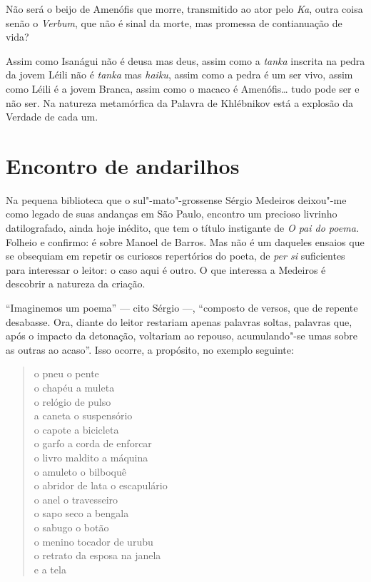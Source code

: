 {Não será o beijo de Amenófis que morre, transmitido ao ator pelo
\emph{Ka}, outra coisa senão o \emph{Verbum}, que não é sinal da morte,
mas promessa de contianuação de vida?

Assim como Isanágui não é deusa mas deus, assim como a \emph{tanka}
inscrita na pedra da jovem Léili não é \emph{tanka} mas \emph{haiku},
assim como a pedra é um ser vivo, assim como Léili é a jovem Branca,
assim como o macaco é Amenófis\ldots{} tudo pode ser e não ser. Na natureza
metamórfica da Palavra de Khlébnikov está a explosão da Verdade de cada
um.

\chapter{Encontro de andarilhos}

Na pequena biblioteca que o sul"-mato"-grossense Sérgio Medeiros deixou"-me
como legado de suas andanças em São Paulo, encontro um precioso livrinho
datilografado, ainda hoje inédito, que tem o título instigante de
\emph{O pai do poema.} Folheio e confirmo: é sobre Manoel de Barros. Mas
não é um daqueles ensaios que se obsequiam em repetir os curiosos
repertórios do poeta, de \emph{per si} suficientes para interessar o
leitor: o caso aqui é outro. O que interessa a Medeiros é descobrir a
natureza da criação.

``Imaginemos um poema'' --- cito Sérgio ---, ``composto de versos, que de
repente desabasse. Ora, diante do leitor restariam apenas palavras
soltas, palavras que, após o impacto da detonação, voltariam ao repouso,
acumulando"-se umas sobre as outras ao acaso''. Isso ocorre, a propósito,
no exemplo seguinte:

\begin{verse}
o pneu o pente \\
o chapéu a muleta \\
o relógio de pulso \\
a caneta o suspensório \\
o capote a bicicleta \\
o garfo a corda de enforcar \\
o livro maldito a máquina \\
o amuleto o bilboquê \\
o abridor de lata o escapulário \\
o anel o travesseiro \\
o sapo seco a bengala \\
o sabugo o botão \\
o menino tocador de urubu \\
o retrato da esposa na janela \\
e a tela
\end{verse}

}
